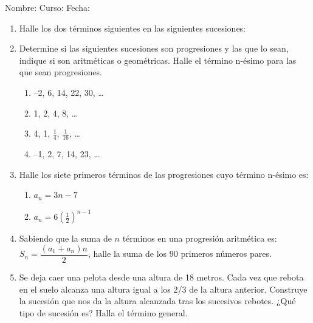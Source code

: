 \documentclass[fleqn]{article}
\newcommand{\LineaNombre}{%
\par
\vspace{\baselineskip}
Nombre:\hrulefill \; Curso: \underline{\hspace*{48pt}} \; Fecha: \underline{\hspace*{2.5cm}} \relax
\par}
\begin{document}
\LineaNombre
\begin{enumerate}
 \item Halle los dos términos siguientes en las siguientes sucesiones:
 \begin{enumerate}
 \end{enumerate}
 \item Determine si las siguientes sucesiones son progresiones y las que lo sean, indique si son aritméticas o geométricas. Halle el término n-ésimo para las que sean progresiones.
 \begin{enumerate}
 \item --2, 6, 14, 22, 30, \ldots \noanswer
 \item 1, 2, 4, 8, \ldots \noanswer
 \item 4, 1, $\frac{1}{4}$, $\frac{1}{16}$, \ldots \noanswer
 \item --1, 2, 7, 14, 23, \ldots \noanswer
 \end{enumerate}
 \item Halle los siete primeros términos de las progresiones cuyo término n-ésimo es:
 \begin{enumerate}
 \item $a_{n}=3n-7$\noanswer[0.25in]
 \item $a_{n}=6(\frac{1}{2})^{n-1}$ \noanswer[0.25in]
 \end{enumerate}
 \newpage
 \item Sabiendo que la suma de $n$ términos en una progresión aritmética es: $S_{n}=\dfrac{(a_{1}+a_{n})n}{2}$, halle la suma de los 90 primeros números pares.\noanswer
 \item Se deja caer una pelota desde una altura de 18 metros. Cada vez que rebota en el suelo alcanza una altura igual a los 2/3 de la altura anterior. Construye la sucesión que nos da la altura alcanzada tras los sucesivos rebotes. ¿Qué tipo de sucesión es? Halla el término general.\noanswer
 \end{enumerate}
\end{document}
